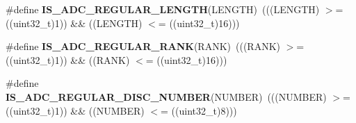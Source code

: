 \begin{DoxyCompactItemize}
\item 
\#define {\bfseries I\+S\+\_\+\+A\+D\+C\+\_\+\+R\+E\+G\+U\+L\+A\+R\+\_\+\+L\+E\+N\+G\+TH}(L\+E\+N\+G\+TH)~(((L\+E\+N\+G\+TH) $>$= ((uint32\+\_\+t)1)) \&\& ((L\+E\+N\+G\+TH) $<$= ((uint32\+\_\+t)16)))\hypertarget{group___a_d_c___private___macros_ga1ea82167f6dccdef1d160675f4534584}{}\label{group___a_d_c___private___macros_ga1ea82167f6dccdef1d160675f4534584}

\item 
\#define {\bfseries I\+S\+\_\+\+A\+D\+C\+\_\+\+R\+E\+G\+U\+L\+A\+R\+\_\+\+R\+A\+NK}(R\+A\+NK)~(((R\+A\+NK) $>$= ((uint32\+\_\+t)1)) \&\& ((R\+A\+NK) $<$= ((uint32\+\_\+t)16)))\hypertarget{group___a_d_c___private___macros_ga5928a1e9315f798e27220b91f1bae7f2}{}\label{group___a_d_c___private___macros_ga5928a1e9315f798e27220b91f1bae7f2}

\item 
\#define {\bfseries I\+S\+\_\+\+A\+D\+C\+\_\+\+R\+E\+G\+U\+L\+A\+R\+\_\+\+D\+I\+S\+C\+\_\+\+N\+U\+M\+B\+ER}(N\+U\+M\+B\+ER)~(((N\+U\+M\+B\+ER) $>$= ((uint32\+\_\+t)1)) \&\& ((N\+U\+M\+B\+ER) $<$= ((uint32\+\_\+t)8)))\hypertarget{group___a_d_c___private___macros_gab8dfaacb2f25e65ca755de71050ff270}{}\label{group___a_d_c___private___macros_gab8dfaacb2f25e65ca755de71050ff270}


\end{DoxyCompactItemize}
